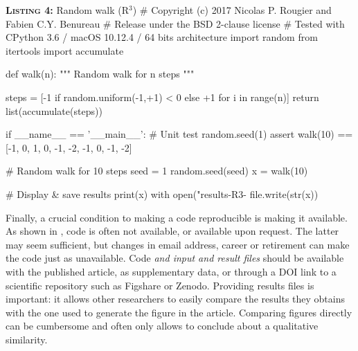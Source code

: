 \documentclass[a4paper,11pt]{article}
\begin{document}


\begin{code}{\textbf{\textsc{Listing 4:}} Random walk (R$^3$)}
# Copyright (c) 2017 Nicolas P. Rougier and Fabien C.Y. Benureau
# Release under the BSD 2-clause license
# Tested with CPython 3.6 / macOS 10.12.4 / 64 bits architecture
import random
from itertools import accumulate

def walk(n):
    """ Random walk for n steps """
  
    steps = [-1 if random.uniform(-1,+1) < 0 else +1 for i in range(n)]
    return list(accumulate(steps))

if __name__ == '__main__':
    # Unit test
    random.seed(1)
    assert walk(10) == [-1, 0, 1, 0, -1, -2, -1, 0, -1, -2]

    # Random walk for 10 steps
    seed = 1
    random.seed(seed)
    x = walk(10)
    
    # Display & save results
    print(x)
    with open("results-R3-%
        file.write(str(x))
\end{code}

Finally, a crucial condition to making a code reproducible is making it available. As shown in \citep{Collberg:2016}, code is often not available, or available upon request. The latter may seem sufficient, but changes in email address,  career or retirement can make the code just as unavailable. Code \emph{and input and result files} should be available with the published article, as supplementary data, or through a DOI link to a scientific repository such as Figshare or Zenodo.
Providing results files is important: it allows other researchers to easily compare the results they obtains with the one used to generate the figure in the article. Comparing figures directly can be cumbersome and often only allows to conclude about a qualitative similarity.\\
\end{document}
